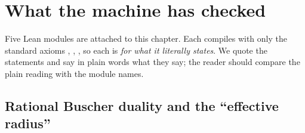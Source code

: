 \section{What the machine has checked}\label{sec:cosmology:lean}

Five Lean modules are attached to this chapter. Each compiles with only the standard axioms
, , , so each is \TA{} \emph{for what
it literally states}. We quote the statements and say in plain words what they say; the
reader should compare the plain reading with the module names.

\subsection{Rational Buscher duality and the ``effective radius''}

